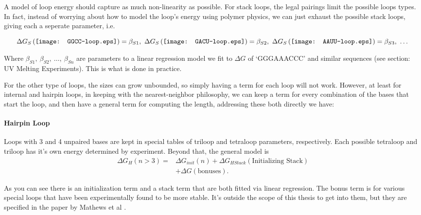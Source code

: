 A model of loop energy should capture as much non-linearity as
possible. For stack loops, the legal pairings limit the possible loops
types. In fact, instead of worrying about how to model the loop's
energy using polymer physics, we can just exhaust the possible stack
loops, giving each a seperate parameter, i.e.

\begin{equation}
\Delta G_S \left ( \vcenter{\hbox{\texttt{[image: GGCC-loop.eps]}}}
\right ) = \beta_{S1}, \  
\Delta G_S \left ( \vcenter{\hbox{\texttt{[image: GACU-loop.eps]}}}
\right ) = \beta_{S2}, \ 
\Delta G_S \left ( \vcenter{\hbox{\texttt{[image: AAUU-loop.eps]}}}
\right ) = \beta_{S3}, \ \dots
\end{equation}

Where $\beta_{S1},\  \beta_{S2},\  \dots,\  \beta_{Sn}$ are parameters to a linear
regression model we fit to $\Delta G$ of `GGGAAACCC' and similar
sequences (see section: UV Melting Experiments). This is what is done in practice.

For the other type of loops, the sizes can grow unbounded, so simply
having a term for each loop will not work. However, at least for
internal and hairpin loops, in keeping with the nearest-neighbor
philosophy, we can keep a term for every combination of the bases that
start the loop, and then have a general term for computing the length,
addressing these both directly we have:

\paragraph{Hairpin Loop} 
Loops with 3 and 4 unpaired bases are kept in special tables of
triloop and tetraloop parameters, respectively. Each possible
tetraloop and triloop has it's own energy determined by
experiment. Beyond that, the general model is 
\begin{align}
\Delta G_H(n > 3) = & \Delta G_{init}(n) + \Delta
G_{HStack} (\text{Initializing Stack}) \\
&+ \Delta G (\text{bonuses}).
\end{align}

As you can see there is an initialization term and a stack term that
are both fitted via linear regression. The bonus term is for various
special loops that have been experimentally found to be more
stable. It's outside the scope of this thesis to get into them, but
they are specified in the paper by Mathews et al \cite{mathews1999expanded}.

